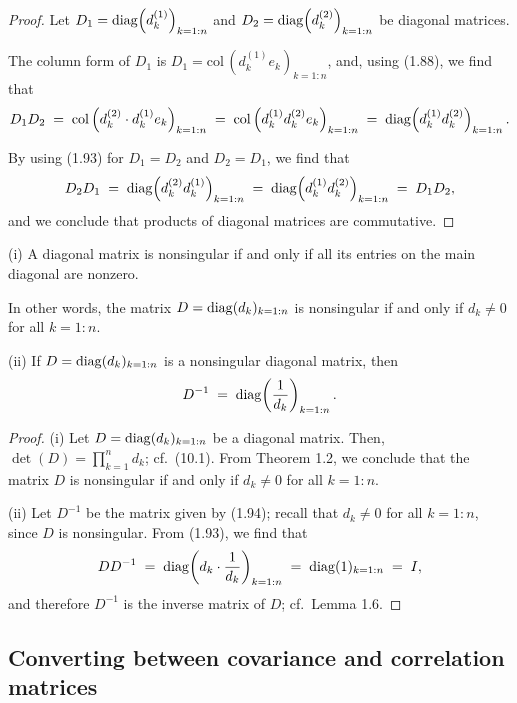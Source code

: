 \begin{proof}
Let $D_1=\operatorname{diag}\!\left(d_k^{(1)}\right)_{k=1:n}$ and
$D_2=\operatorname{diag}\!\left(d_k^{(2)}\right)_{k=1:n}$ be diagonal matrices.

The column form of $D_1$ is $D_1=\mathrm{col}\,\!\left(d_k^{(1)}e_k\right)_{k=1:n}$,
and, using (1.88), we find that
\[
D_1D_2 \;=\; \mathrm{col}\,\!\left(d_k^{(2)}\cdot d_k^{(1)}e_k\right)_{k=1:n}
\;=\; \mathrm{col}\,\!\left(d_k^{(1)}d_k^{(2)}e_k\right)_{k=1:n}
\;=\; \operatorname{diag}\!\left(d_k^{(1)}d_k^{(2)}\right)_{k=1:n}.
\]

By using (1.93) for $D_1=D_2$ and $D_2=D_1$, we find that
\[
D_2D_1 \;=\; \operatorname{diag}\!\left(d_k^{(2)}d_k^{(1)}\right)_{k=1:n} \;=\; \operatorname{diag}\!\left(d_k^{(1)}d_k^{(2)}\right)_{k=1:n} \;=\; D_1D_2,
\]
and we conclude that products of diagonal matrices are commutative.
\end{proof}

\begin{lemma}
(i) A diagonal matrix is nonsingular if and only if all its entries on the
main diagonal are nonzero.

In other words, the matrix $D=\operatorname{diag}(d_k)_{k=1:n}$ is nonsingular if and
only if $d_k\ne 0$ for all $k=1:n$.

(ii) If $D=\operatorname{diag}(d_k)_{k=1:n}$ is a nonsingular diagonal matrix, then
\begin{equation}
D^{-1} \;=\; \operatorname{diag}\!\left(\frac{1}{d_k}\right)_{k=1:n}.
\end{equation}
\end{lemma}

\begin{proof}
(i) Let $D=\operatorname{diag}(d_k)_{k=1:n}$ be a diagonal matrix. Then,
$\det(D)=\prod_{k=1}^n d_k$; cf.\ (10.1). From Theorem 1.2, we conclude
that the matrix $D$ is nonsingular if and only if $d_k\ne 0$ for all
$k=1:n$.

(ii) Let $D^{-1}$ be the matrix given by (1.94); recall that $d_k\ne 0$
for all $k=1:n$, since $D$ is nonsingular. From (1.93), we find that
\[
DD^{-1} \;=\; \operatorname{diag}\!\left(d_k\cdot\frac{1}{d_k}\right)_{k=1:n} \;=\; \operatorname{diag}(1)_{k=1:n} \;=\; I,
\]
and therefore $D^{-1}$ is the inverse matrix of $D$; cf.\ Lemma 1.6.
\end{proof}

\subsection{Converting between covariance and correlation matrices}

